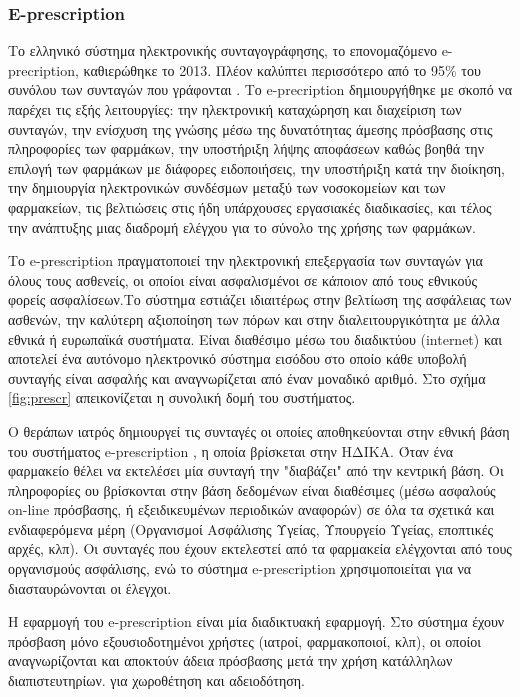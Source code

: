 	\subsubsection{E-prescription }
	
		Το ελληνικό σύστημα ηλεκτρονικής συνταγογράφησης,  το επονομαζόμενο e-precription, καθιερώθηκε το 2013. Πλέον καλύπτει περισσότερο  από το 95\% του συνόλου των συνταγών που γράφονται . Το e-precription δημιουργήθηκε με σκοπό να παρέχει τις εξής λειτουργίες: την ηλεκτρονική καταχώρηση και διαχείριση των συνταγών, την ενίσχυση της γνώσης μέσω της δυνατότητας άμεσης πρόσβασης στις πληροφορίες των φαρμάκων, την υποστήριξη λήψης αποφάσεων καθώς βοηθά την επιλογή των φαρμάκων με διάφορες ειδοποιήσεις, την υποστήριξη κατά την διοίκηση, την δημιουργία ηλεκτρονικών συνδέσμων μεταξύ των νοσοκομείων και των φαρμακείων, τις βελτιώσεις στις ήδη υπάρχουσες εργασιακές διαδικασίες, και τέλος την ανάπτυξης μιας διαδρομή ελέγχου για το σύνολο της χρήσης των φαρμάκων.  \cite{miller}
		
		Το e-prescription πραγματοποιεί την ηλεκτρονική επεξεργασία των συνταγών για όλους τους ασθενείς, οι οποίοι είναι ασφαλισμένοι σε κάποιον από τους εθνικούς φορείς ασφαλίσεων.Το σύστημα εστιάζει ιδιαιτέρως στην βελτίωση της ασφάλειας των ασθενών, την καλύτερη αξιοποίηση των πόρων και στην διαλειτουργικότητα με άλλα εθνικά ή ευρωπαϊκά συστήματα. Είναι διαθέσιμο μέσω του διαδικτύου (internet) και αποτελεί ένα αυτόνομο ηλεκτρονικό σύστημα εισόδου στο οποίο κάθε υποβολή συνταγής είναι ασφαλής και αναγνωρίζεται από έναν μοναδικό αριθμό. Στο σχήμα \ref{fig:prescr} απεικονίζεται η συνολική δομή του συστήματος. \cite{pangalos}
		
		Ο θεράπων ιατρός δημιουργεί τις συνταγές οι οποίες αποθηκεύονται στην εθνική βάση του συστήματος e-prescription , η οποία βρίσκεται στην ΗΔΙΚΑ. \cite{idika}Όταν ένα φαρμακείο θέλει να εκτελέσει μία συνταγή την  "διαβάζει" από την κεντρική βάση. Οι πληροφορίες ου βρίσκονται στην βάση δεδομένων είναι διαθέσιμες (μέσω ασφαλούς on-line πρόσβασης, ή εξειδικευμένων περιοδικών αναφορών) σε όλα τα σχετικά και ενδιαφερόμενα μέρη (Οργανισμοί Ασφάλισης Υγείας, Υπουργείο Υγείας, εποπτικές αρχές, κλπ). Οι συνταγές που έχουν εκτελεστεί από τα φαρμακεία  ελέγχονται από τους οργανισμούς ασφάλισης, ενώ το σύστημα e-prescription χρησιμοποιείται για να διασταυρώνονται οι έλεγχοι. \cite{papala}

	Η εφαρμογή του e-prescription είναι μία διαδικτυακή εφαρμογή. Στο σύστημα έχουν πρόσβαση μόνο εξουσιοδοτημένοι χρήστες (ιατροί, φαρμακοποιοί, κλπ), οι οποίοι αναγνωρίζονται και αποκτούν άδεια πρόσβασης μετά την χρήση κατάλληλων διαπιστευτηρίων. για χωροθέτηση και αδειοδότηση.
	
